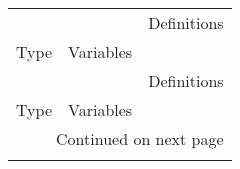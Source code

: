 \begin{longtable}[h!]{lll}
\toprule
               &         &                                                                                          Definitions \\
Type & Variables &                                                                                                      \\
\midrule
\endfirsthead

\toprule
               &         &                                                                                          Definitions \\
Type & Variables &                                                                                                      \\
\midrule
\endhead
\midrule
\multicolumn{3}{r}{{Continued on next page}} \\
\midrule
\endfoot


\end{longtable}
